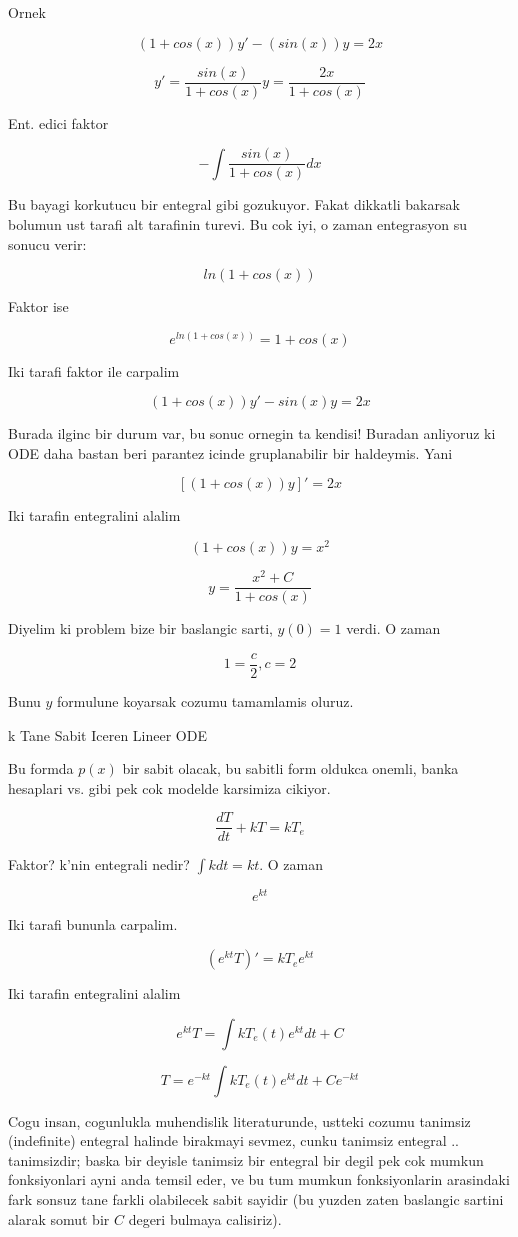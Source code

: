 \documentclass[12pt,fleqn]{article}\usepackage{../common}
\begin{document}
Ornek 

\[ (1+cos(x))y' - (sin(x))y = 2x \]

\[ y' = \frac{sin(x)}{1+cos(x)}y = \frac{2x}{1+cos(x)} \]

Ent. edici faktor

\[ - \int \frac{sin(x)}{1+cos(x)} dx \]

Bu bayagi korkutucu bir entegral gibi gozukuyor. Fakat dikkatli
bakarsak bolumun ust tarafi alt tarafinin turevi. Bu cok iyi, o zaman
entegrasyon su sonucu verir:

\[ ln (1+cos(x)) \]

Faktor ise

\[ e^{ln (1+cos(x))} = 1+cos(x) \]

Iki tarafi faktor ile carpalim

\[ (1+cos(x)) y' - sin(x)y = 2x \]

Burada ilginc bir durum var, bu sonuc ornegin ta kendisi! Buradan
anliyoruz ki ODE daha bastan beri parantez icinde gruplanabilir bir
haldeymis. Yani

\[ [(1+cos(x))y]' = 2x \]

Iki tarafin entegralini alalim

\[ (1+cos(x))y = x^2 \]

\[ y = \frac{x^2+C}{1+cos(x)} \]

Diyelim ki problem bize bir baslangic sarti, $y(0) = 1$ verdi. O zaman

\[ 1=\frac{c}{2}, c=2 \]

Bunu $y$ formulune koyarsak cozumu tamamlamis oluruz. 

k Tane Sabit Iceren Lineer ODE

Bu formda $p(x)$ bir sabit olacak, bu sabitli form oldukca onemli,
banka hesaplari vs. gibi pek cok modelde karsimiza cikiyor.

\[ \frac{dT}{dt} + kT = kT_e \]

Faktor? k'nin entegrali nedir? $\int k dt = kt$. O zaman

\[ e^{kt} \]

Iki tarafi bununla carpalim. 

\[ (e^{kt} T)' = kT_e e^{kt} \]

Iki tarafin entegralini alalim

\[ e^{kt} T = \int kT_e(t) e^{kt}dt + C\]

\[ T = e^{-kt} \int kT_e(t) e^{kt} dt + C e^{-kt} \]

Cogu insan, cogunlukla muhendislik literaturunde, ustteki cozumu
tanimsiz (indefinite) entegral halinde birakmayi sevmez, cunku
tanimsiz entegral .. tanimsizdir; baska bir deyisle tanimsiz bir
entegral bir degil pek cok mumkun fonksiyonlari ayni anda temsil eder,
ve bu tum mumkun fonksiyonlarin arasindaki fark sonsuz tane farkli
olabilecek sabit sayidir (bu yuzden zaten baslangic sartini alarak
somut bir $C$ degeri bulmaya calisiriz). 
\end{document}

